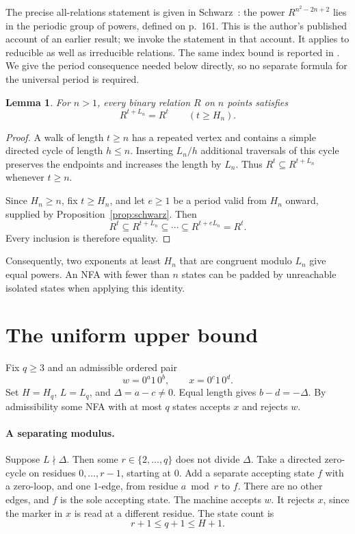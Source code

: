 \documentclass[11pt,a4paper]{article}
\newtheorem{lemma}[theorem]{Lemma}
\begin{document}
The precise all-relations statement is given in
Schwarz~\cite[p.~167, proof of Theorem~3, Case~1]{schwarz1974}:
the power \(R^{n^2-2n+2}\) lies in the periodic group of powers, defined
on p.~161. This is the author's published account of an earlier result;
we invoke the statement in that account. It applies to reducible as well
as irreducible relations. The same index bound is reported in
\cite[Theorem~1]{zajac2012}. We give the period consequence needed below
directly, so no separate formula for the universal period is required.

\begin{lemma}\label{lem:period}
For \(n>1\), every binary relation \(R\) on \(n\) points satisfies
\begin{equation}\label{eq:period}
 R^{t+L_n}=R^t\qquad(t\geq H_n).
\end{equation}
\end{lemma}
\begin{proof}
A walk of length \(t\geq n\) has a repeated vertex and contains a simple
directed cycle of length \(h\leq n\). Inserting \(L_n/h\) additional
traversals of this cycle preserves the endpoints and increases the
length by \(L_n\). Thus \(R^t\subseteq R^{t+L_n}\) whenever \(t\geq n\).

Since \(H_n\geq n\), fix \(t\geq H_n\), and let \(e\geq1\) be a period
valid from \(H_n\) onward, supplied by Proposition~\ref{prop:schwarz}.
Then
\[
 R^t\subseteq R^{t+L_n}\subseteq\cdots
       \subseteq R^{t+eL_n}=R^t.
\]
Every inclusion is therefore equality.
\end{proof}

Consequently, two exponents at least \(H_n\) that are congruent modulo
\(L_n\) give equal powers. An NFA with fewer than \(n\) states can be
padded by unreachable isolated states when applying this identity.

\section{The uniform upper bound}

Fix \(q\geq3\) and an admissible ordered pair
\[
 w=0^a1\,0^b,\qquad x=0^c1\,0^d.
\]
Set \(H=H_q\), \(L=L_q\), and \(\Delta=a-c\ne0\).
Equal length gives \(b-d=-\Delta\). By admissibility some NFA with at
most \(q\) states accepts \(x\) and rejects \(w\).

\paragraph{A separating modulus.}
Suppose \(L\nmid\Delta\). Then some \(r\in\{2,\ldots,q\}\) does not
divide \(\Delta\). Take a directed zero-cycle on residues
\(0,\ldots,r-1\), starting at \(0\). Add a separate accepting state \(f\)
with a zero-loop, and one \(1\)-edge, from residue \(a\bmod r\) to \(f\).
There are no other edges, and \(f\) is the sole accepting state.
The machine accepts \(w\). It rejects \(x\), since the marker in \(x\)
is read at a different residue. The state count is
\[
 r+1\leq q+1\leq H+1.
\]
\end{document}
